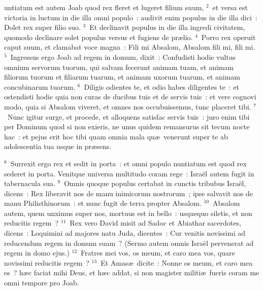 \bchapter
{}untiatum est autem Joab quod rex fleret et lugeret filium suum,
${}^{2}$~et versa est victoria in luctum in die illa omni populo~: audivit enim populus in die illa dici~: Dolet rex super filio suo.
${}^{3}$~Et declinavit populus in die illa ingredi civitatem, quomodo declinare solet populus versus et fugiens de pr\ae lio.
${}^{4}$~Porro rex operuit caput suum, et clamabat voce magna~: Fili mi Absalom, Absalom fili mi, fili mi.
${}^{5}$~Ingressus ergo Joab ad regem in domum, dixit~: Confudisti hodie vultus omnium servorum tuorum, qui salvam fecerunt animam tuam, et animam filiorum tuorum et filiarum tuarum, et animam uxorum tuarum, et animam concubinarum tuarum.
${}^{6}$~Diligis odientes te, et odio habes diligentes te~: et ostendisti hodie quia non curas de ducibus tuis et de servis tuis~: et vere cognovi modo, quia si Absalom viveret, et omnes nos occubuissemus, tunc placeret tibi.
${}^{7}$~Nunc igitur surge, et procede, et alloquens satisfac servis tuis~: juro enim tibi per Dominum quod si non exieris, ne unus quidem remansurus sit tecum nocte hac~: et pejus erit hoc tibi quam omnia mala qu\ae\ venerunt super te ab adolescentia tua usque in pr\ae sens.


${}^{8}$~Surrexit ergo rex et sedit in porta~: et omni populo nuntiatum est quod rex sederet in porta. Venitque universa multitudo coram rege~: Isra\"el autem fugit in tabernacula sua.
${}^{9}$~Omnis quoque populus certabat in cunctis tribubus Isra\"el, dicens~: Rex liberavit nos de manu inimicorum nostrorum~; ipse salvavit nos de manu Philisthinorum~: et nunc fugit de terra propter Absalom.
${}^{10}$~Absalom autem, quem unximus super nos, mortuus est in bello~: usquequo siletis, et non reducitis regem~?
${}^{11}$~Rex vero David misit ad Sadoc et Abiathar sacerdotes, dicens~: Loquimini ad majores natu Juda, dicentes~: Cur venitis novissimi ad reducendum regem in domum suam~? (Sermo autem omnis Isra\"el pervenerat ad regem in domo ejus.)
${}^{12}$~Fratres mei vos, os meum, et caro mea vos, quare novissimi reducitis regem~?
${}^{13}$~Et Amas\ae\ dicite~: Nonne os meum, et caro mea es~? h\ae c faciat mihi Deus, et h\ae c addat, si non magister militi\ae\ fueris coram me omni tempore pro Joab.


